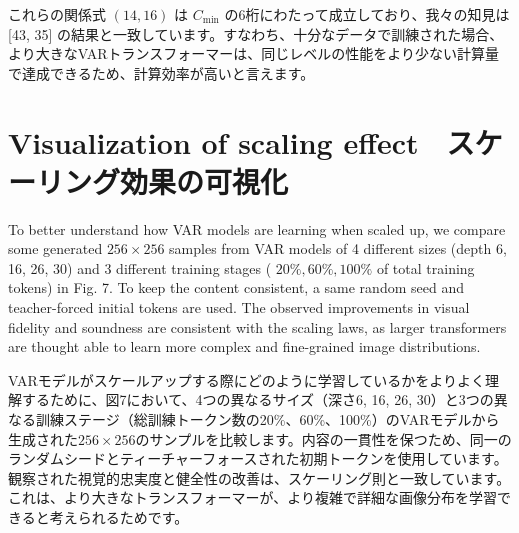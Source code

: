 \documentclass{article}
\begin{document}
これらの関係式 $(14, 16)$ は $C_{\text{min}}$ の6桁にわたって成立しており、我々の知見は [43, 35] の結果と一致しています。すなわち、十分なデータで訓練された場合、より大きなVARトランスフォーマーは、同じレベルの性能をより少ない計算量で達成できるため、計算効率が高いと言えます。

\section{Visualization of scaling effect　スケーリング効果の可視化}
To better understand how VAR models are learning when scaled up, we compare some generated $256 \times 256$ samples from VAR models of 4 different sizes (depth 6, 16, 26, 30) and 3 different training stages ( $20 \%, 60 \%, 100 \%$ of total training tokens) in Fig. 7. To keep the content consistent, a same random seed and teacher-forced initial tokens are used. The observed improvements in visual fidelity and soundness are consistent with the scaling laws, as larger transformers are thought able to learn more complex and fine-grained image distributions.

VARモデルがスケールアップする際にどのように学習しているかをよりよく理解するために、図7において、4つの異なるサイズ（深さ6, 16, 26, 30）と3つの異なる訓練ステージ（総訓練トークン数の20\%、60\%、100\%）のVARモデルから生成された$256 \times 256$のサンプルを比較します。内容の一貫性を保つため、同一のランダムシードとティーチャーフォースされた初期トークンを使用しています。観察された視覚的忠実度と健全性の改善は、スケーリング則と一致しています。これは、より大きなトランスフォーマーが、より複雑で詳細な画像分布を学習できると考えられるためです。
\end{document}
